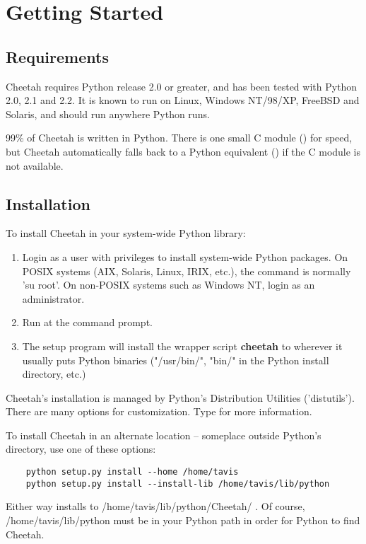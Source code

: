 \section{Getting Started}
\label{gettingStarted}

\subsection{Requirements}
\label{gettingStarted.requirements}

Cheetah requires Python release 2.0 or greater, and has been tested with Python
2.0, 2.1 and 2.2.  It is known to run on Linux, Windows NT/98/XP, FreeBSD and
Solaris, and should run anywhere Python runs.  

99\% of Cheetah is written in Python.  There is one small C module
() for speed, but Cheetah automatically falls back to a
Python equivalent () if the C module is not available.

\subsection{Installation}
\label{gettingStarted.install}

To install Cheetah in your system-wide Python library:
\begin{enumerate}
\item Login as a user with privileges to install system-wide Python packages.
     On POSIX systems (AIX, Solaris, Linux, IRIX, etc.), the command is normally
     'su root'.  On non-POSIX systems such as Windows NT, login as an
     administrator.

\item Run  at the command prompt.

\item The setup program will install the wrapper script {\bf cheetah} to 
     wherever it usually puts Python binaries ("/usr/bin/", "bin/" in the 
     Python install directory, etc.)
\end{enumerate}

Cheetah's installation is managed by Python's Distribution Utilities
('distutils').  There are many options for customization.  Type  for more information.

To install Cheetah in an alternate location -- someplace outside Python's
 directory, use one of these options:
\begin{verbatim}
    python setup.py install --home /home/tavis 
    python setup.py install --install-lib /home/tavis/lib/python
\end{verbatim}
Either way installs to /home/tavis/lib/python/Cheetah/ .  Of course,
/home/tavis/lib/python must be in your Python path in order for Python to
find Cheetah.

